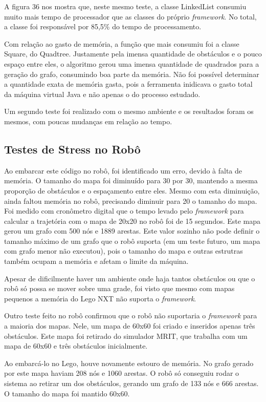 A figura 36 nos mostra que, neste mesmo teste, a classe LinkedList consumiu muito mais tempo de processador que as classes do próprio \textit{framework}. No total, a classe foi responsável por 85,5\% do tempo de processamento.

Com relação ao gasto de memória, a função que mais consumiu foi a classe Square, do Quadtree. Justamente pela imensa quantidade de obstáculos e o pouco espaço entre eles, o algoritmo gerou uma imensa quantidade de quadrados para a geração do grafo, consumindo boa parte da memória. Não foi possível determinar a quantidade exata de memória gasta, pois a ferramenta inidicava o gasto total da máquina virtual Java e não apenas o do processo estudado.

Um segundo teste foi realizado com o mesmo ambiente e os resultados foram os mesmos, com poucas mudanças em relação ao tempo.

\subsection{Testes de Stress no Robô}

Ao embarcar este código no robô, foi identificado um erro, devido à falta de memória. O tamanho do mapa foi diminuído para 30 por 30, mantendo a mesma proporção de obstáculos e o espaçamento entre eles. Mesmo com esta diminuição, ainda faltou memória no robô, precisando diminuir para 20 o tamanho do mapa. Foi medido com cronômetro digital que o tempo levado pelo \textit{framework} para calcular a trajetória com o mapa de 20x20 no robô foi de 15 segundos. Este mapa gerou um grafo com 500 nós e 1889 arestas. Este valor sozinho não pode definir o tamanho máximo de um grafo que o robô suporta (em um teste futuro, um mapa com grafo menor não executou), pois o tamanho do mapa e outras estrutras também ocupam a memória e afetam o limite da máquina.

Apesar de dificilmente haver um ambiente onde haja tantos obstáculos ou que o robô só possa se mover sobre uma grade, foi visto que mesmo com mapas pequenos a memória do Lego NXT não suporta o \textit{framework}. 

Outro teste feito no robô confirmou que o robô não suportaria o \textit{framework} para a maioria dos mapas. Nele, um mapa de 60x60 foi criado e inseridos apenas três obstáculos. Este mapa foi retirado do simulador MRIT, que trabalha com um mapa de 60x60 e três obstáculos inicialmente. 

Ao embarcá-lo no Lego, houve novamente estouro de memória. No grafo gerado por este mapa haviam 208 nós e 1060 arestas. O robô só conseguiu rodar o sistema ao retirar um dos obstáculos, gerando um grafo de 133 nós e 666 arestas. O tamanho do mapa foi mantido 60x60.

